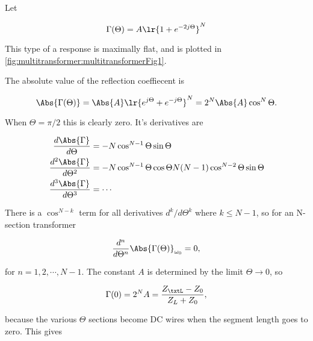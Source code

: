 Let

\begin{equation}\label{eqn:uwavesDeck7MultisectionTransformersCore:120}
\Gamma(\Theta) = A \lr{ 1 + e^{-2 j \Theta} }^N
\end{equation}

This type of a response is maximally flat, and is plotted in \cref{fig:multitransformer:multitransformerFig1}.

The absolute value of the reflection coeffiecent is

\begin{dmath}\label{eqn:uwavesDeck7MultisectionTransformersCore:160}
\Abs{\Gamma(\Theta)} 
= 
\Abs{A} \lr{ e^{j \Theta} + e^{- j \Theta} }^N
= 
2^N \Abs{A} \cos^N\Theta.
\end{dmath}

When \( \Theta = \pi/2 \) this is clearly zero.  It's derivatives are

\begin{equation}\label{eqn:uwavesDeck7MultisectionTransformersCore:180}
\begin{aligned}
\frac{d \Abs{\Gamma}}{d\Theta} &= -N \cos^{N-1} \Theta \sin\Theta \\
\frac{d^2 \Abs{\Gamma}}{d\Theta^2} &= -N \cos^{N-1} \Theta \cos\Theta N(N-1) \cos^{N-2} \Theta \sin\Theta  \\
\frac{d^3 \Abs{\Gamma}}{d\Theta^3} &= \cdots 
\end{aligned}
\end{equation}

There is a \( \cos^{N-k} \) term for all derivatives \( d^k/d\Theta^k \) where \( k \le N-1 \), so for an N-section transformer

\begin{equation}\label{eqn:uwavesDeck7MultisectionTransformersCore:140}
\frac{d^n}{d\Theta^n} \Abs{\Gamma(\Theta)}_{\omega_0} = 0,
\end{equation}

for \( n = 1, 2, \cdots, N-1 \).  The constant \( A \) is determined by the limit \( \Theta \rightarrow 0 \), so

\begin{equation}\label{eqn:uwavesDeck7MultisectionTransformersCore:200}
\Gamma(0) = 2^N A = \frac{Z_\txtL - Z_0}{Z_L + Z_0}, 
\end{equation}

because the various \( \Theta \) sections become DC wires when the segment length goes to zero.  This gives

